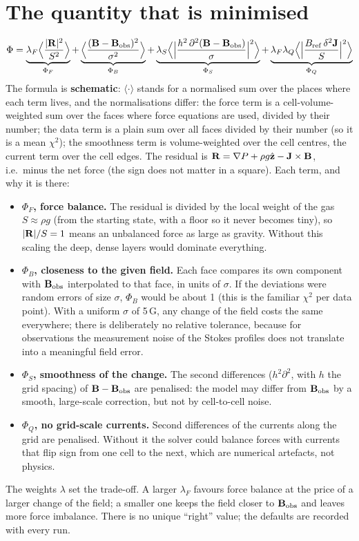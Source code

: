 \section{The quantity that is minimised}
\[
\Phi=\underbrace{\lambda_F\Big\langle\frac{|\mathbf R|^2}{S^2}\Big\rangle}_{\Phi_F}
+\underbrace{\Big\langle\frac{(\mathbf B-\mathbf B_{\rm obs})^2}{\sigma^2}\Big\rangle}_{\Phi_B}
+\underbrace{\lambda_S\Big\langle\Big|\frac{h^2\,\partial^2(\mathbf B-\mathbf B_{\rm obs})}{\sigma}\Big|^2\Big\rangle}_{\Phi_S}
+\underbrace{\lambda_F\lambda_Q\Big\langle\Big|\frac{B_{\rm ref}\,\delta^2\mathbf J}{S}\Big|^2\Big\rangle}_{\Phi_Q}
\]
The formula is \textbf{schematic}: $\langle\cdot\rangle$ stands for a normalised sum over the places where each term lives,
and the normalisations differ: the force term is a cell-volume-weighted sum over the faces where force equations are used,
divided by their number; the data term is a plain sum over all faces divided by their number (so it is a mean $\chi^2$);
the smoothness term is volume-weighted over the cell centres, the current term over the cell edges. The residual is
$\mathbf R=\nabla P+\rho g\hat{\mathbf z}-\mathbf J\times\mathbf B$, i.e.\ minus the net force (the sign does not matter in a square). Each term, and why it
is there:
\begin{itemize}
\item \textbf{$\Phi_F$, force balance.} The residual is divided by the local weight of the gas $S\approx\rho g$ (from the
starting state, with a floor so it never becomes tiny), so $|\mathbf R|/S=1$ means an unbalanced force as large as gravity. Without
this scaling the deep, dense layers would dominate everything.
\item \textbf{$\Phi_B$, closeness to the given field.} Each face compares its own component with $\mathbf B_{\rm obs}$ interpolated to that
face, in units of $\sigma$. If the deviations were random errors of size $\sigma$, $\Phi_B$ would be about 1 (this is the
familiar $\chi^2$ per data point). With a uniform $\sigma$ of 5\,G, any change of the field costs the same everywhere; there
is deliberately no relative tolerance, because for observations the measurement noise of the Stokes profiles does not
translate into a meaningful field error.
\item \textbf{$\Phi_S$, smoothness of the change.} The second differences ($h^2\partial^2$, with $h$ the grid spacing) of
$\mathbf B-\mathbf B_{\rm obs}$ are penalised: the model may differ from $\mathbf B_{\rm obs}$ by a smooth, large-scale correction, but not by cell-to-cell noise.
\item \textbf{$\Phi_Q$, no grid-scale currents.} Second differences of the currents along the grid are penalised. Without it
the solver could balance forces with currents that flip sign from one cell to the next, which are numerical artefacts, not
physics.
\end{itemize}
The weights $\lambda$ set the trade-off. A larger $\lambda_F$ favours force balance at the price of a larger change of the
field; a smaller one keeps the field closer to $\mathbf B_{\rm obs}$ and leaves more force imbalance. There is no unique ``right'' value; the
defaults are recorded with every run.

